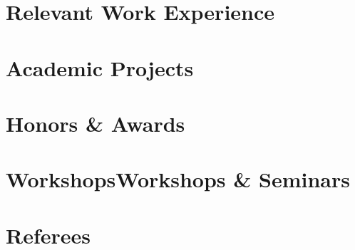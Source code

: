 \documentclass[a4paper]{article}
\begin{document}
\section{Relevant Work Experience}
\section{Academic Projects}
\section{Honors \& Awards}
\section{WorkshopsWorkshops \& Seminars}
\section{Referees}
\end{document}
